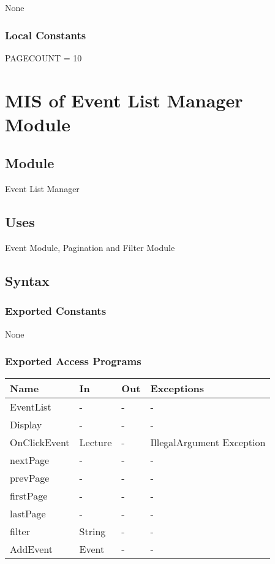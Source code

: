 \documentclass[12pt, titlepage]{article}
\begin{document}
None

\subsubsection{Local Constants}

PAGECOUNT = 10

\newpage

\section{MIS of Event List Manager Module} \label{mEL}

\subsection{Module}

Event List Manager

\subsection{Uses}

Event Module, Pagination and Filter Module

\subsection{Syntax}

\subsubsection{Exported Constants}
None

\subsubsection{Exported Access Programs}
\begin{center}
\begin{tabular}{p{4cm} p{2cm} p{4cm} p{4cm}}
\hline
\textbf{Name} & \textbf{In} & \textbf{Out} & \textbf{Exceptions} \\
\hline
EventList & - & - & -\\
Display & - & - & - \\
OnClickEvent & Lecture & - & IllegalArgument Exception\\ 
nextPage & - & - &  -\\
prevPage & - & - &  -\\
firstPage & - & - &  -\\
lastPage & - & - &  -\\
filter & String & - & -\\
AddEvent & Event & - & - \\
\hline
\end{tabular}
\end{center}
\end{document}

